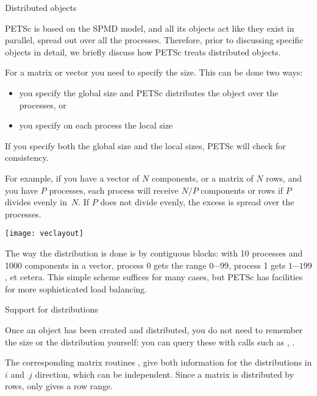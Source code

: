 
 {Distributed objects}

PETSc is based on the \ac{SPMD} model, and all its objects act like
they exist in parallel, spread out over all the processes.  Therefore,
prior to discussing specific objects in detail, we briefly discuss how
PETSc treats distributed objects.

For a matrix or vector you need to specify the size. This can be done two ways:
\begin{itemize}
\item you specify the global size and PETSc distributes the object over the processes, or
\item you specify on each process the local size
\end{itemize}
If you specify both the global size and the local sizes, PETSc will check for consistency.

For example, if you have a vector of $N$ components, or a matrix of $N$
rows, and you have $P$ processes, each process will receive $N/P$
components or rows if $P$ divides evenly in~$N$. If $P$ does not divide
evenly, the excess is spread over the processes.

\texttt{[image: veclayout]}

The way the distribution is done is by contiguous blocks: with 10
processes and 1000 components in a vector, process 0 gets the range
$0\cdots99$, process 1 gets $1\cdots199$, et cetera. This simple scheme suffices for
many cases, but PETSc has facilities for more sophisticated load
balancing.

 {Support for distributions}

Once an object has been created and distributed, you do not need to
remember the size or the distribution yourself: you can query these
with calls such as ,
.

The
corresponding matrix routines ,
 give both information for the
distributions in $i$ and~$j$ direction, which can be
independent. Since a matrix is distributed by rows,
 only gives a row range.

